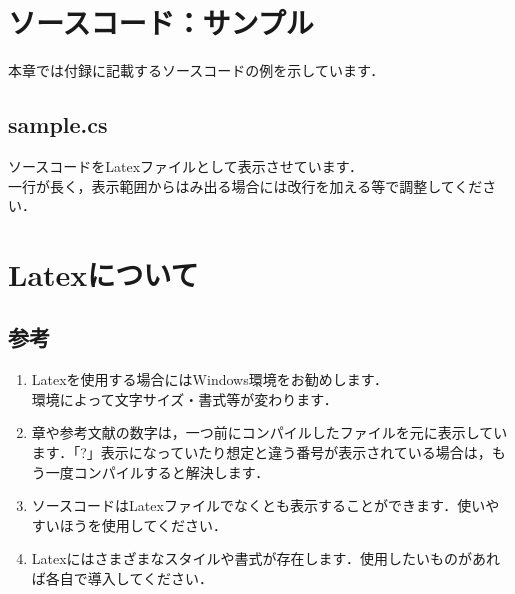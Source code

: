 \chapter{ソースコード：サンプル}
本章では付録に記載するソースコードの例を示しています．

\newpage

\section{sample.cs}
{\tiny }

ソースコードをLatexファイルとして表示させています．\\
一行が長く，表示範囲からはみ出る場合には改行を加える等で調整してください．

\chapter{Latexについて}

\newpage

\section{参考}
\begin{enumerate}
	\item Latexを使用する場合にはWindows環境をお勧めします．\\
			環境によって文字サイズ・書式等が変わります．
	\item 章や参考文献の数字は，一つ前にコンパイルしたファイルを元に表示しています．「?」表示になっていたり想定と違う番号が表示されている場合は，もう一度コンパイルすると解決します．
	\item ソースコードはLatexファイルでなくとも表示することができます．使いやすいほうを使用してください．
	\item Latexにはさまざまなスタイルや書式が存在します．使用したいものがあれば各自で導入してください．
\end{enumerate}